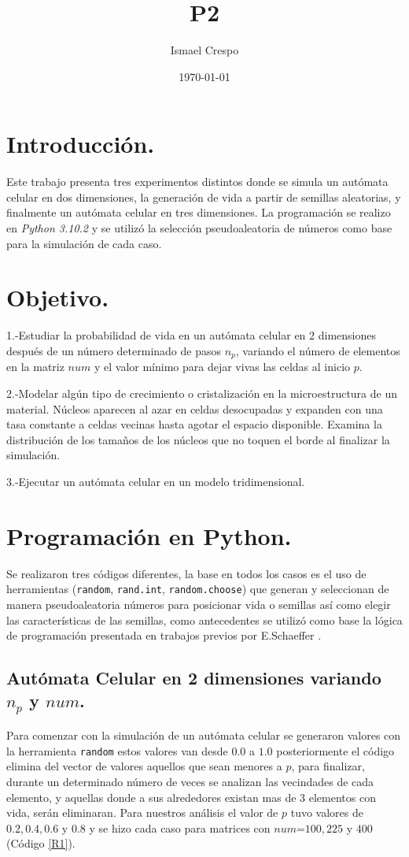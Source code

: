 \documentclass{article}
\title{P2}
\author{Ismael Crespo}
\date{\today}
\begin{document}
\maketitle

\section{Introducción.}
Este trabajo presenta tres experimentos distintos donde se simula un autómata celular en dos dimensiones, la generación de vida a partir de semillas aleatorias, y finalmente un autómata celular en tres dimensiones. La programación se realizo en \emph{Python 3.10.2} y se utilizó la selección pseudoaleatoria de números como base para la simulación de cada caso.
\section{Objetivo.}
1.-Estudiar la probabilidad de vida en un autómata celular en 2 dimensiones después de un número determinado de pasos $n_p$, variando el número de elementos en la matriz $num$ y el valor mínimo para dejar vivas las celdas al inicio $p$.

2.-Modelar algún tipo de crecimiento o cristalización en la microestructura de un material. Núcleos aparecen al azar en celdas desocupadas y expanden con una tasa constante a celdas vecinas hasta agotar el espacio disponible. Examina la distribución de los tamaños de los núcleos que no toquen el borde al finalizar la simulación.

3.-Ejecutar un autómata celular en un modelo tridimensional.
 
\section{Programación en Python.}
Se realizaron tres códigos diferentes, la base en todos los casos es el uso de herramientas (\texttt{random}, \texttt{rand.int}, \texttt{random.choose}) que generan y seleccionan de manera pseudoaleatoria números para posicionar vida o semillas así como elegir las características de las semillas, como antecedentes se utilizó como base la lógica de programación presentada en trabajos previos por E.Schaeffer \citep{E.Schaeffer}. 
\subsection {Autómata Celular en 2 dimensiones variando $n_p$ y $num$.}
Para comenzar con la simulación de un autómata celular se generaron valores con la herramienta \texttt{random} estos valores van desde $0.0$ a $1.0$ posteriormente el código elimina del vector de valores aquellos que sean menores a $p$, para finalizar, durante un determinado número de veces se analizan las vecindades de cada elemento, y aquellas donde a sus alrededores existan mas de 3 elementos con vida, serán eliminaran. Para nuestros análisis el valor de $p$  tuvo valores de $0.2, 0.4, 0.6$ y $0.8$ y se hizo cada caso para matrices con $num$=$100, 225$ y $400$ (Código \ref{R1}).
\end{document}
